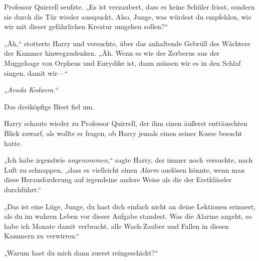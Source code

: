 Professor Quirrell seufzte.
„Es ist verzaubert, dass es keine Schüler frisst, sondern sie durch die Tür wieder ausspuckt. Also, Junge, was würdest du empfehlen, wie wir mit dieser gefährlichen Kreatur umgehen sollen?“

„Äh,“ stotterte Harry und versuchte, über das anhaltende Gebrüll des Wächters der Kammer hinwegzudenken. „Äh. Wenn es wie der Zerberus aus der Muggelsage von Orpheus und Eurydike ist, dann müssen wir es in den Schlaf singen, damit wir—“

„\emph{Avada Kedavra.}“

Das dreiköpfige Biest fiel um.

Harry schaute wieder zu Professor Quirrell, der ihm einen äußerst enttäuschten Blick zuwarf, als wollte er fragen, ob Harry jemals einen seiner Kurse besucht hatte.

„Ich habe irgendwie \emph{angenommen},“ sagte Harry, der immer noch versuchte, nach Luft zu schnappen, „dass es vielleicht einen \emph{Alarm} auslösen könnte, wenn man diese Herausforderung auf irgendeine andere Weise als die der Erstklässler durchführt.“

„Das ist eine Lüge, Junge, du hast dich einfach nicht an deine Lektionen erinnert, als du im wahren Leben vor dieser Aufgabe standest. Was die Alarme angeht, so habe ich Monate damit verbracht, alle Wach-Zauber und Fallen in diesen Kammern zu verwirren.“

„Warum hast du mich dann zuerst reingeschickt?“

